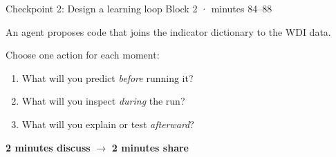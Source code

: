 \begin{frame}{Checkpoint 2: Design a learning loop}
  \alert{Block 2 · minutes 84--88}

  \vspace{0.55em}
  An agent proposes code that joins the indicator dictionary to the WDI data.

  \vspace{0.55em}
  Choose one action for each moment:
  \begin{enumerate}
    \item What will you predict \emph{before} running it?
    \item What will you inspect \emph{during} the run?
    \item What will you explain or test \emph{afterward}?
  \end{enumerate}

  \vfill
  \begin{center}
    \textbf{2 minutes discuss} \hspace{2.0em} $\longrightarrow$ \hspace{2.0em}
    \textbf{2 minutes share}
  \end{center}
\end{frame}
